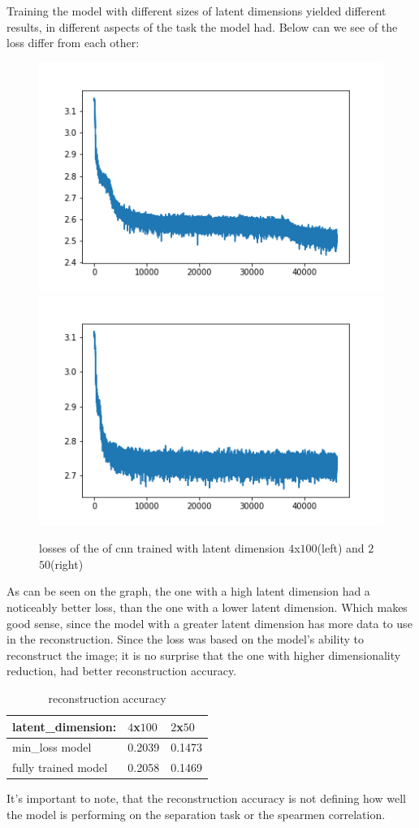 Training the model with different sizes of latent dimensions yielded different results, in different aspects of the task the model had. Below can we see of the loss differ from each other: \\


\begin{figure}[!ht]
  \centering
  \includegraphics[width=0.4\linewidth]{latex/imgs/CNN_loss_latent_dimension_100.png}
  \includegraphics[width=0.4\linewidth]{latex/imgs/loss_latent_dimension_50.png}
  \caption{losses of the of cnn trained with latent dimension $4$x$100$(left) and $2$$50$(right)}
\end{figure}

\noindent
As can be seen on the graph, the one with a high latent dimension had a noticeably better loss, than the one with a lower latent dimension. Which makes good sense, since the model with a greater latent dimension has more data to use in the reconstruction. Since the loss was based on the model's ability to reconstruct the image; it is no surprise that the one with higher dimensionality reduction, had better reconstruction accuracy.

\begin{table}[h]
\centering
\begin{tabular}{|l|l|l|}
\hline
 latent\_dimension: & $4$x$100$  &  $2$x$50$ \\ \hline
min\_loss model     & 0.2039 & 0.1473 \\ \hline
fully trained model & 0.2058 & 0.1469 \\ \hline
\end{tabular}
\caption{reconstruction accuracy}
\end{table}

\noindent
It's important to note, that the reconstruction accuracy is not defining how well the model is performing on the separation task or the spearmen correlation.\\

